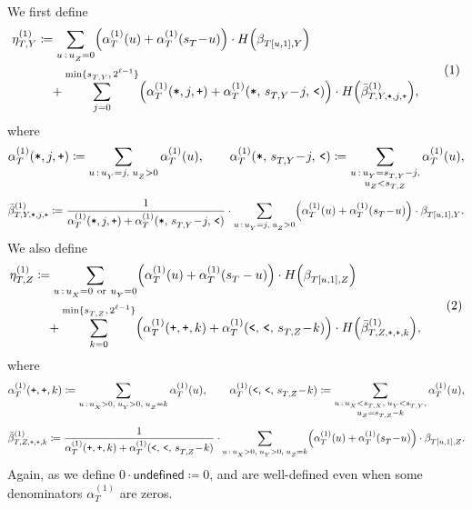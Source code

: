 \documentclass[11pt, a4paper, copyright, gdm]{google}
\theoremstyle{definition}
\theoremstyle{remark}
\theoremstyle{plain}
\newcommand{\defeq}{\coloneqq}
\DeclarePairedDelimiter{\bk}{(}{)}
\DeclarePairedDelimiter{\BK}{\{}{\}}
\newcommand{\numberthis}{\addtocounter{equation}{1}\tag{\theequation}}
\renewcommand{\ip}{\text{\ttfamily +}}  %
\newcommand{\is}{\text{\ttfamily *}}  %
\newcommand{\il}{\text{\ttfamily <}}  %
\begin{document}
We first define
\[
  \begin{aligned}
    \eta_{T,Y}^{(1)}
     & \defeq
    \sum_{u \,:\, u_Z^{} = 0}
    \Bigl(\alpha_T^{(1)}(u) + \alpha_T^{(1)}(s_T^{} \!-\! u)\Bigr) \cdot
    H\bk*{\beta_{T[u,1],Y}^{}} \\
     & \quad+
    \sum_{j=0}^{\min\BK{s_{T,Y}^{},\, 2^{\ell - 1}}}
    \Bigl(
    \alpha_T^{(1)}(\is,j,\ip)
    + \alpha_T^{(1)}(\is,\, s_{T,Y}^{} \!-\! j,\, \il)
    \Bigr) \cdot
    H\bk*{\bar\beta_{T,Y,\is,j,\ip}^{(1)}},
  \end{aligned}
  \numberthis \label{eq:positive-shape-eta-Y}
\]
where
\[
  \begin{aligned}
    \alpha_T^{(1)}(\is,j,\ip)
    \defeq
    \sum_{u \,:\, u_Y^{} = j,\; u_Z^{} > 0}
    \alpha_T^{(1)}(u),
    \qquad
    \alpha_T^{(1)}(\is,\, s_{T,Y}^{} \!-\! j,\, \il)
    \defeq
    \sum_{\substack{u \,:\, u_Y^{} = s_{T,Y}^{} - j, \\
    u_Z^{} < s_{T,Z}^{}}}
    \alpha_T^{(1)}(u),
  \end{aligned}
\]
\[
  \bar\beta_{T,Y,\is,j,\ip}^{(1)}
  \defeq
  \frac{1}{\alpha_T^{(1)}(\is,j,\ip) + \alpha_T^{(1)}(\is,\, s_{T,Y}^{} \!-\! j,\, \il)}
  \cdot
  \sum_{u \,:\, u_Y^{} = j,\; u_Z^{} > 0}
  \Bigl(\alpha_T^{(1)}(u) + \alpha_T^{(1)}(s_T^{} \!-\! u)\Bigr) \cdot \beta_{T[u,1],Y}^{}.
\]
We also define
\[
  \begin{aligned}
    \eta_{T,Z}^{(1)}
     & \defeq
    \sum_{u \,:\, u_X^{} = 0\ \mathrm{or}\ u_Y^{} = 0}
    \Bigl(\alpha_T^{(1)}(u) + \alpha_T^{(1)}(s_T^{} - u)\Bigr) \cdot
    H\bk*{\beta_{T[u,1],Z}^{}} \\
     & \quad+
    \sum_{k=0}^{\min\BK{s_{T,Z}^{},\, 2^{\ell-1}}}
    \Bigl(
    \alpha_T^{(1)}(\ip,\ip,k)
    + \alpha_T^{(1)}(\il,\, \il,\, s_{T,Z}^{} \!-\! k)
    \Bigr) \cdot
    H\bk*{\bar\beta_{T,Z,\ip,\ip,k}^{(1)}},
  \end{aligned}
  \numberthis \label{eq:positive-shape-eta-Z}
\]
where
\[
  \begin{aligned}
    \alpha_T^{(1)}(\ip,\ip,k)
    \defeq
    \sum_{u \,:\, u_X^{} > 0,\; u_Y^{} > 0,\; u_Z^{} = k}
    \alpha_T^{(1)}(u),
    \qquad
    \alpha_T^{(1)}(\il,\, \il,\, s_{T,Z}^{} \!-\! k)
    \defeq
    \sum_{\substack{u \,:\, u_X^{} < s_{T,X}^{},\; u_Y^{} < s_{T,Y}^{}, \\
    u_Z^{} = s_{T,Z}^{} - k}}
    \alpha_T^{(1)}(u),
  \end{aligned}
\]
\[
  \bar\beta_{T,Z,\ip,\ip,k}^{(1)}
  \defeq
  \frac{1}{\alpha_T^{(1)}(\ip,\ip,k) + \alpha_T^{(1)}(\il,\, \il,\, s_{T,Z}^{} \!-\! k)}
  \cdot
  \sum_{u \,:\, u_X^{} > 0,\; u_Y^{} > 0,\; u_Z^{} = k}
  \Bigl(\alpha_T^{(1)}(u) + \alpha_T^{(1)}(s_T^{} \!-\! u)\Bigr) \cdot \beta_{T[u,1],Z}^{}.
\]
Again, as we define $0 \cdot \textsf{undefined} \defeq 0$,  and  are well-defined even when some denominators $\alpha_T^{(1)}$ are zeros.
\end{document}
